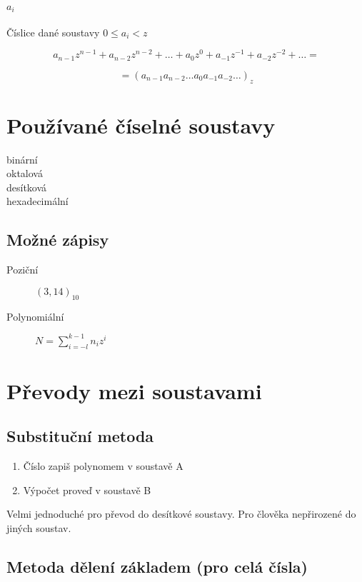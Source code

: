 \documentclass[a4paper, 11pt]{report}
\begin{document}
\paragraph{$a_i$} Číslice dané soustavy $ 0 \le a_i < z$

$$a_{n-1}z^{n-1} + a_{n-2} z^{n-2} + \dots + a_0 z^0 + a_{-1} z^{-1} + a_{-2} z^{-2} + \dots =$$

$$ = (a_{n-1} a_{n-2}  \dots a_0 a_{-1} a_{-2} \dots)_z$$

\section{Používané číselné soustavy}

\begin{description}
	\item[binární]
	\item[oktalová]
	\item[desítková]
	\item[hexadecimální]
\end{description}

\subsection{Možné zápisy}
\begin{description}
	\item[Poziční] $(3,14)_{10}$
	\item[Polynomiální] $N =  \sum_{i=-l}^{k-1} n_i z^i$
\end{description}

\section{Převody mezi soustavami}

\subsection{Substituční metoda}

\begin{enumerate}
	\item Číslo zapiš polynomem  v soustavě A
	\item Výpočet proveď v soustavě B
\end{enumerate}


Velmi jednoduché pro převod do desítkové soustavy. Pro člověka nepřirozené do jiných soustav.

\subsection{Metoda dělení základem (pro celá čísla)}
\end{document}
